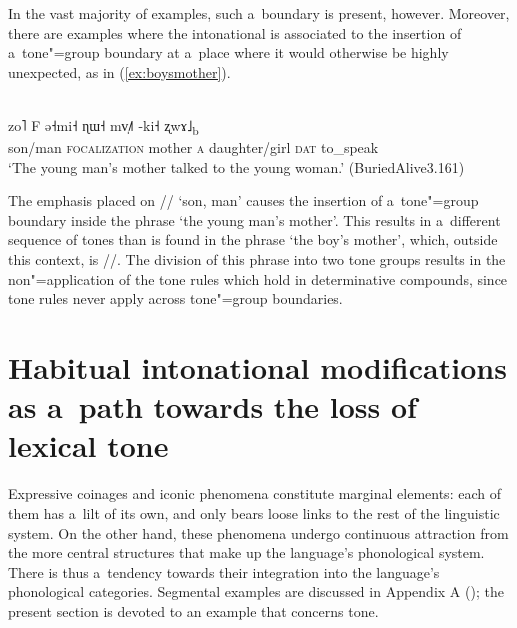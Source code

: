 In
the vast majority of examples, such a~boundary is present, however. Moreover, there are examples
where the intonational  is associated to the insertion of a~tone"=group boundary at
a~place where it would otherwise be highly unexpected, as in (\ref{ex:boysmother}).

\begin{exe}
	\ex
	\label{ex:boysmother}
	\\ 
	\gll zo˥		F							ə˧mi˧		ɳɯ˧	 				mv̩˩˥			-ki˧ 			ʐwɤ˩\textsubscript{b}\\
	son/man		\textsc{focalization}	mother	\textsc{a}	daughter/girl		\textsc{dat}	to\_speak\\
	\glt ‘The young man's mother talked to the young woman.’ (BuriedAlive3.161)
\end{exe}

The emphasis placed on // ‘son, man’ causes the insertion of  a~tone"=group boundary inside the phrase ‘the young man’s mother’. This results in a~different sequence of tones than is found in the phrase ‘the boy’s mother’, which, outside this context, is //. The division of this phrase into two tone groups results in the non"=application of the tone rules
which hold in determinative compounds, since tone rules never apply across tone"=group boundaries. 


\section[Intonational modifications as a~path towards the loss of lexical tone]{Habitual intonational modifications as a~path towards the loss of lexical tone}
\label{sec:expressiveandiconicphenomena}
\label{sec:towardsthelossoflexicaltoneonsomegrammaticalwordsthroughhabitualintonationalmodifications}

Expressive coinages and iconic phenomena constitute marginal elements: each of them has a~lilt of its own, and only bears loose links to the rest of the linguistic system. On the other hand, these phenomena undergo continuous attraction from the more central structures that make up the language's phonological system. There is thus a~tendency towards their integration into the language's phonological categories. Segmental examples are discussed in Appendix A (); the present section is devoted to an example that concerns tone. 

